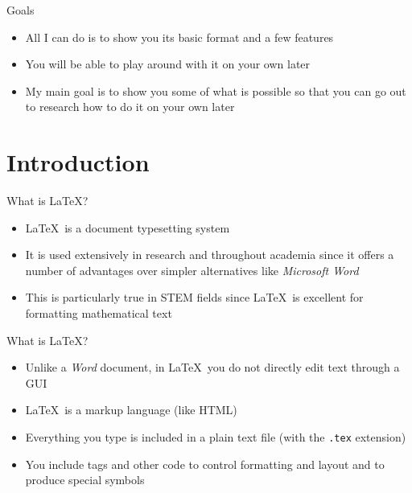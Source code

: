 \documentclass{beamer} %
\begin{document}
\begin{frame}{Goals}

\begin{itemize}
	\item All I can do is to show you its basic format and a few features
	\item You will be able to play around with it on your own later
	\item My main goal is to show you some of what is possible so that you can go out to research how to do it on your own later
\end{itemize}

\end{frame}

\section{Introduction}

\begin{frame}{What is \LaTeX?}

\begin{itemize}
	\item \LaTeX\ is a document typesetting system
	\item It is used extensively in research and throughout academia since it offers a number of advantages over simpler alternatives like \textit{Microsoft Word}
	\item This is particularly true in STEM fields since \LaTeX\ is excellent for formatting mathematical text
\end{itemize}

\end{frame}

\begin{frame}{What is \LaTeX?}

\begin{itemize}
	\item Unlike a \textit{Word} document, in \LaTeX\ you do not directly edit text through a GUI
	\item \LaTeX\ is a markup language (like HTML)
	\item Everything you type is included in a plain text file (with the \texttt{.tex} extension)
	\item You include tags and other code to control formatting and layout and to produce special symbols
\end{itemize}

\end{frame}
\end{document}
